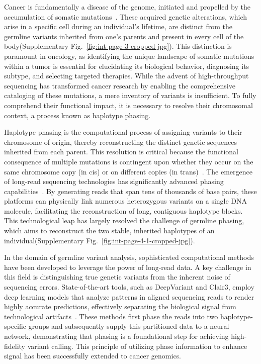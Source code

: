 \documentclass[pdflatex,sn-nature]{sn-jnl}
\begin{document}
Cancer is fundamentally a disease of the genome, initiated and propelled by the accumulation of somatic mutations~\cite{vogelstein2013, stratton2009, vogelstein2004}. These acquired genetic alterations, which arise in a specific cell during an individual's lifetime, are distinct from the germline variants inherited from one's parents and present in every cell of the body(Supplementary Fig.~\ref{fig:int-page-3-cropped-jpg}). This distinction is paramount in oncology, as identifying the unique landscape of somatic mutations within a tumor is essential for elucidating its biological behavior, diagnosing its subtype, and selecting targeted therapies. While the advent of high-throughput sequencing has transformed cancer research by enabling the comprehensive cataloging of these mutations, a mere inventory of variants is insufficient. To fully comprehend their functional impact, it is necessary to resolve their chromosomal context, a process known as haplotype phasing.

Haplotype phasing is the computational process of assigning variants to their chromosome of origin, thereby reconstructing the distinct genetic sequences inherited from each parent. This resolution is critical because the functional consequence of multiple mutations is contingent upon whether they occur on the same chromosome copy (in cis) or on different copies (in trans)~\cite{garg2021, glusman2014}. The emergence of long-read sequencing technologies has significantly advanced phasing capabilities~\cite{warburton2023, maestri2020}. By generating reads that span tens of thousands of base pairs, these platforms can physically link numerous heterozygous variants on a single DNA molecule, facilitating the reconstruction of long, contiguous haplotype blocks. This technological leap has largely resolved the challenge of germline phasing, which aims to reconstruct the two stable, inherited haplotypes of an individual(Supplementary Fig.~\ref{fig:int-page-4-1-cropped-jpg}).

In the domain of germline variant analysis, sophisticated computational methods have been developed to leverage the power of long-read data. A key challenge in this field is distinguishing true genetic variants from the inherent noise of sequencing errors. State-of-the-art tools, such as DeepVariant and Clair3, employ deep learning models that analyze patterns in aligned sequencing reads to render highly accurate predictions, effectively separating the biological signal from technological artifacts~\cite{poplin2018, kolesnikov2023, zheng2022}. These methods first phase the reads into two haplotype-specific groups and subsequently supply this partitioned data to a neural network, demonstrating that phasing is a foundational step for achieving high-fidelity variant calling. This principle of utilizing phase information to enhance signal has been successfully extended to cancer genomics.
\end{document}
